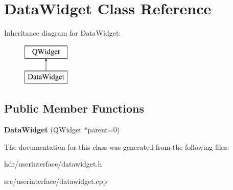 \section{Data\-Widget Class Reference}
\label{class_data_widget}
Inheritance diagram for Data\-Widget\-:\begin{figure}[H]
\begin{center}
\leavevmode
\includegraphics[height=2.000000cm]{class_data_widget}
\end{center}
\end{figure}
\subsection*{Public Member Functions}
\begin{DoxyCompactItemize}
\item 
{\bfseries Data\-Widget} (Q\-Widget $\ast$parent=0)\label{class_data_widget_a79d08690bee156d8e5782ce7bfd30aae}

\end{DoxyCompactItemize}


The documentation for this class was generated from the following files\-:\begin{DoxyCompactItemize}
\item 
hdr/userinterface/datawidget.\-h\item 
src/userinterface/datawidget.\-cpp\end{DoxyCompactItemize}
